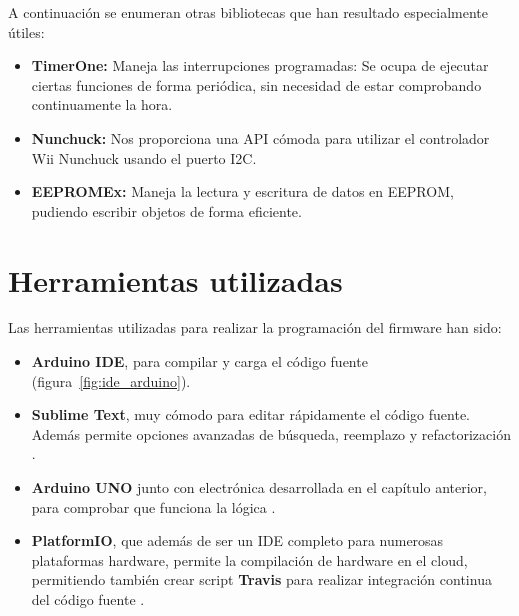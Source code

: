 A continuación se enumeran otras bibliotecas que han resultado especialmente útiles: 

\begin{itemize}
	\item \textbf{TimerOne:} Maneja las interrupciones programadas: Se ocupa de ejecutar ciertas funciones de forma periódica, sin necesidad de estar comprobando continuamente la hora.
	
	\item\textbf{Nunchuck:} Nos proporciona una API cómoda para utilizar el controlador Wii Nunchuck usando el puerto I2C.
	
	\item \textbf{EEPROMEx:} Maneja la lectura y escritura de datos en EEPROM, pudiendo escribir objetos de forma eficiente.
\end{itemize}


\section{Herramientas utilizadas}

Las herramientas utilizadas para realizar la programación del firmware han sido:

\begin{itemize}
	\item \textbf{Arduino IDE}, para compilar y carga el código fuente \cite{ARDUINO} (figura~\ref{fig:ide_arduino}).
	\item \textbf{Sublime Text}, muy cómodo para editar rápidamente el código fuente. Además permite opciones avanzadas de búsqueda, reemplazo y refactorización \cite{sublimetext}.
	\item \textbf{Arduino UNO} junto con electrónica desarrollada en el capítulo anterior, para comprobar que funciona la lógica \cite{ARDUINO}. 
	\item \textbf{PlatformIO}, que además de ser un IDE completo para numerosas plataformas hardware, permite la compilación de hardware en el cloud, permitiendo también crear script \textbf{Travis} para realizar integración continua del código fuente \cite{patform}. 
\end{itemize}


